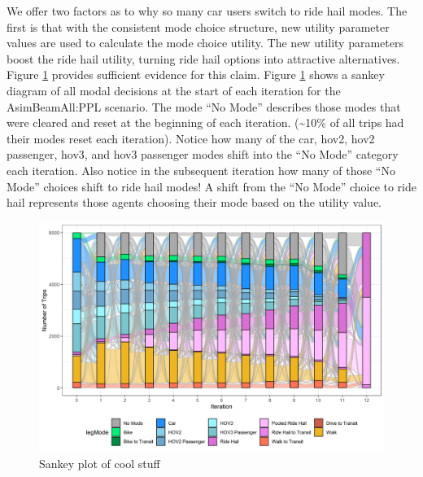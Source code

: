 \documentclass[12pt, oneside, openright]{byuthesis}
\begin{document}
We offer two factors as to why so many car users switch to ride hail modes. The first is that with the consistent mode choice structure, new utility parameter values are used to calculate the mode choice utility. The new utility parameters boost the ride hail utility, turning ride hail options into attractive alternatives. Figure \ref{fig:sankey} provides sufficient evidence for this claim. Figure \ref{fig:sankey} shows a sankey diagram of all modal decisions at the start of each iteration for the AsimBeamAll:PPL scenario. The mode ``No Mode'' describes those modes that were cleared and reset at the beginning of each iteration. (\textasciitilde10\% of all trips had their modes reset each iteration). Notice how many of the car, hov2, hov2 passenger, hov3, and hov3 passenger modes shift into the ``No Mode'' category each iteration. Also notice in the subsequent iteration how many of those ``No Mode'' choices shift to ride hail modes! A shift from the ``No Mode'' choice to ride hail represents those agents choosing their mode based on the utility value.

\begin{landscape}

\begin{figure}[H]
\centering
\includegraphics{planshifts.png}
\caption{Sankey plot of cool stuff}
\label{fig:sankey}
\end{figure}

\end{landscape}
\end{document}
